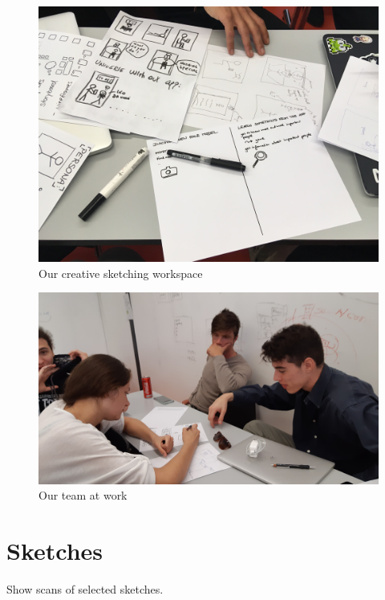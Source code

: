 \documentclass[12pt]{scrartcl}
\begin{document}
	\begin{figure}[H]
        		\centering
       		\includegraphics[width=\textwidth]{../images/group1.jpg}
       		\caption{Our creative sketching workspace}
        		\label{group1}
	\end{figure}
	
	\begin{figure}[H]
        		\centering
       		\includegraphics[width=\textwidth]{../images/group2.jpg}
       		\caption{Our team at work}
        		\label{group2}
	\end{figure}
	
	
\section{Sketches}
	
	Show scans of selected sketches.
	
\end{document}
